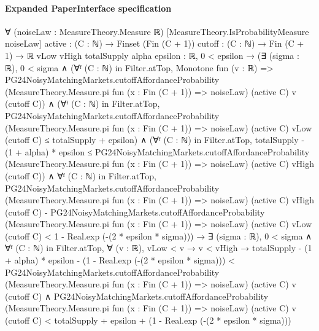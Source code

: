 \documentclass[10pt]{article}
\begin{document}
\paragraph{Expanded PaperInterface specification}
\begin{ReviewVerbatim}
∀ (noiseLaw : MeasureTheory.Measure ℝ) [MeasureTheory.IsProbabilityMeasure noiseLaw]
  {active : (C : ℕ) → Finset (Fin (C + 1))} {cutoff : (C : ℕ) → Fin (C + 1) → ℝ}
  {vLow vHigh totalSupply alpha epsilon : ℝ},
  0 < epsilon →
    (∃ (sigma : ℝ),
        0 < sigma ∧
          (∀ᶠ (C : ℕ) in Filter.atTop,
              Monotone fun (v : ℝ) =>
                PG24NoisyMatchingMarkets.cutoffAffordanceProbability
                  (MeasureTheory.Measure.pi fun (x : Fin (C + 1)) => noiseLaw) (active C) v (cutoff C)) ∧
            (∀ᶠ (C : ℕ) in Filter.atTop,
                PG24NoisyMatchingMarkets.cutoffAffordanceProbability
                    (MeasureTheory.Measure.pi fun (x : Fin (C + 1)) => noiseLaw) (active C) vLow (cutoff C) ≤
                  totalSupply + epsilon) ∧
              (∀ᶠ (C : ℕ) in Filter.atTop,
                  totalSupply - (1 + alpha) * epsilon ≤
                    PG24NoisyMatchingMarkets.cutoffAffordanceProbability
                      (MeasureTheory.Measure.pi fun (x : Fin (C + 1)) => noiseLaw) (active C) vHigh (cutoff C)) ∧
                ∀ᶠ (C : ℕ) in Filter.atTop,
                  PG24NoisyMatchingMarkets.cutoffAffordanceProbability
                        (MeasureTheory.Measure.pi fun (x : Fin (C + 1)) => noiseLaw) (active C) vHigh (cutoff C) -
                      PG24NoisyMatchingMarkets.cutoffAffordanceProbability
                        (MeasureTheory.Measure.pi fun (x : Fin (C + 1)) => noiseLaw) (active C) vLow (cutoff C) <
                    1 - Real.exp (-(2 * epsilon * sigma))) →
      ∃ (sigma : ℝ),
        0 < sigma ∧
          ∀ᶠ (C : ℕ) in Filter.atTop,
            ∀ (v : ℝ),
              vLow < v →
                v < vHigh →
                  totalSupply - (1 + alpha) * epsilon - (1 - Real.exp (-(2 * epsilon * sigma))) <
                      PG24NoisyMatchingMarkets.cutoffAffordanceProbability
                        (MeasureTheory.Measure.pi fun (x : Fin (C + 1)) => noiseLaw) (active C) v (cutoff C) ∧
                    PG24NoisyMatchingMarkets.cutoffAffordanceProbability
                        (MeasureTheory.Measure.pi fun (x : Fin (C + 1)) => noiseLaw) (active C) v (cutoff C) <
                      totalSupply + epsilon + (1 - Real.exp (-(2 * epsilon * sigma)))
\end{ReviewVerbatim}
\end{document}
